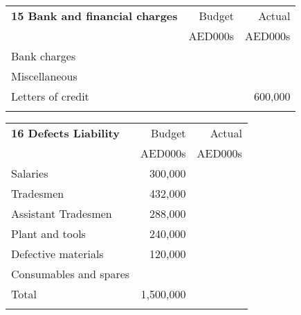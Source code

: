 \documentclass[oneside]{scrbook}
\begin{document}
\begin{tabularx}{\textwidth}{@{}Xrr@{}}
\textbf{15 Bank and financial charges}                                     &Budget   &Actual\\
                                                                                              &AED000s &AED000s\\
\noalign{\DotRow{}{}}                                                            
 Bank charges                                                                         & &\\
 Miscellaneous                                                                        &&\\
 Letters of credit                                                                      & &600,000\\   
 \noalign{\DotRow{}{}}                     
\end{tabularx}                                                                                             

\bigskip

\begin{tabularx}{\textwidth}{@{}Xrr@{}}
\textbf{16 Defects Liability}                                     &Budget   &Actual\\
                                                                             &AED000s &AED000s\\
\noalign{\DotRow{}{}}                                                                            
Salaries                                                                  &300,000  &   \\                                                                        
Tradesmen                                                             &432,000 &   \\
Assistant Tradesmen                                               &288,000 & \\
Plant and tools                                                       &240,000 & \\
Defective materials                                                 &120,000 &\\
Consumables and spares                                         &&\\               
\noalign{\DotRow{}{}}                     
Total &1,500,000 &\\
\noalign{\DotRow{}{}} 
\end{tabularx} 
\vspace*{1cm}
\end{document}
